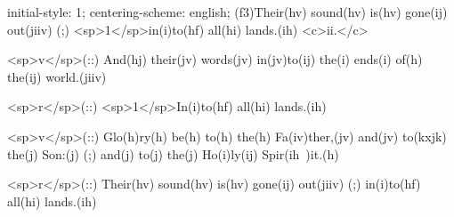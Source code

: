 initial-style: 1;
centering-scheme: english;
(f3)Their(hv) sound(hv) is(hv) gone(ij) out(jiiv) (;) <sp>1</sp>in(i)to(hf) all(hi) lands.(ih) <c>ii.</c>

<sp>v</sp>(::) And(hj) their(jv) words(jv) in(jv)to(ij) the(i) ends(i) of(h) the(ij) world.(jiiv)

<sp>r</sp>(::) <sp>1</sp>In(i)to(hf) all(hi) lands.(ih)

<sp>v</sp>(::) Glo(h)ry(h) be(h) to(h) the(h) Fa(iv)ther,(jv) and(jv) to(kxjk) the(j) Son:(j) (;) and(j) to(j) the(j) Ho(i)ly(ij) Spir(ih~)it.(h)

<sp>r</sp>(::) Their(hv) sound(hv) is(hv) gone(ij) out(jiiv) (;) in(i)to(hf) all(hi) lands.(ih)
